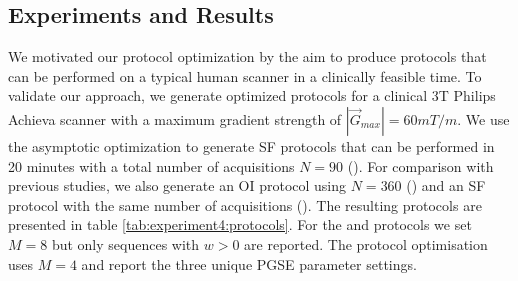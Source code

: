\subsection*{Experiments and Results}
\begin{table}
\centering
\caption{PGSE settings of \SFshort{}, \SFlong{} and \OIlong{} protocols. $\perp$ and $\parallel$ mark acquisitions perpendicular and parallel to the fibre bundles.}
\hspace{0.6cm}
\label{tab:experiment4:protocols}
\end{table}
We motivated our protocol optimization by the aim to produce protocols that can be performed on a typical human scanner in a clinically feasible time. To validate our approach, we generate optimized protocols for a clinical 3T Philips Achieva scanner with a maximum gradient strength of $|\vec{G}_{max}|=60mT/m$. We use the asymptotic optimization to generate SF protocols that can be performed in 20 minutes with a total number of acquisitions $N=90$ (\SFshort). For comparison with previous studies, we also generate an OI protocol using $N=360$ (\OIlong) and an SF protocol with the same number of acquisitions (\SFlong). The resulting protocols are presented in table \ref{tab:experiment4:protocols}. For the \SFshort{} and \SFlong{} protocols we set $M=8$ but only sequences with $w>0$ are reported. The \OIlong{} protocol optimisation uses $M=4$ and report the three unique PGSE parameter settings.
